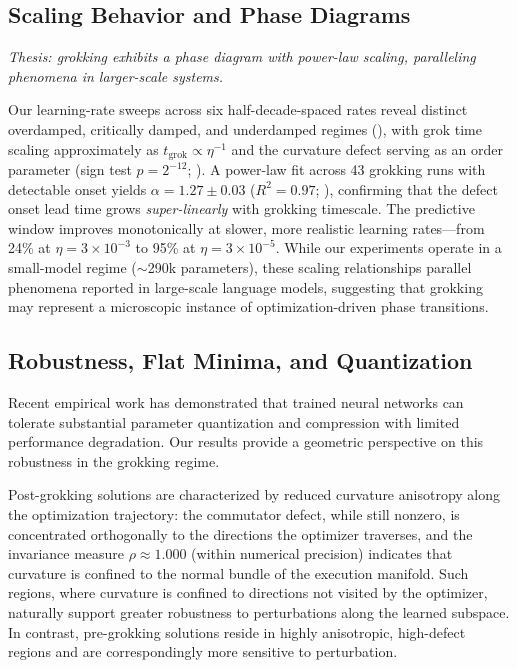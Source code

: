 \documentclass[11pt]{article}
\begin{document}
\subsection{Scaling Behavior and Phase Diagrams}
\label{sec:disc_scaling}

\emph{Thesis: grokking exhibits a phase diagram with power-law scaling, paralleling phenomena in larger-scale systems.}

Our learning-rate sweeps across six half-decade-spaced rates reveal distinct overdamped, critically damped, and underdamped regimes (), with grok time scaling approximately as $t_\text{grok} \propto \eta^{-1}$ and the curvature defect serving as an order parameter (sign test $p = 2^{-12}$; ).
A power-law fit across 43 grokking runs with detectable onset yields $\alpha = 1.27 \pm 0.03$ ($R^2 = 0.97$; ), confirming that the defect onset lead time grows \emph{super-linearly} with grokking timescale.
The predictive window improves monotonically at slower, more realistic learning rates---from 24\% at $\eta = 3\!\times\!10^{-3}$ to 95\% at $\eta = 3\!\times\!10^{-5}$.
While our experiments operate in a small-model regime ($\sim$290k parameters), these scaling relationships parallel phenomena reported in large-scale language models, suggesting that grokking may represent a microscopic instance of optimization-driven phase transitions.

\subsection{Robustness, Flat Minima, and Quantization}
\label{sec:disc_robustness}

Recent empirical work has demonstrated that trained neural networks can tolerate substantial parameter quantization and compression with limited performance degradation.
Our results provide a geometric perspective on this robustness in the grokking regime.

Post-grokking solutions are characterized by reduced curvature anisotropy along the optimization trajectory: the commutator defect, while still nonzero, is concentrated orthogonally to the directions the optimizer traverses, and the invariance measure $\rho \approx 1.000$ (within numerical precision) indicates that curvature is confined to the normal bundle of the execution manifold.
Such regions, where curvature is confined to directions not visited by the optimizer, naturally support greater robustness to perturbations along the learned subspace.
In contrast, pre-grokking solutions reside in highly anisotropic, high-defect regions and are correspondingly more sensitive to perturbation.
\end{document}
